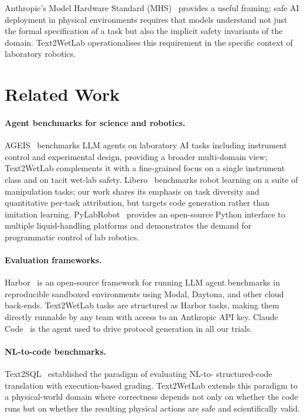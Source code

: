 \documentclass[11pt,a4paper]{article}
\begin{document}
Anthropic's Model Hardware Standard (MHS)~\citep{anthropic2026mhs}
provides a useful framing: safe AI deployment in physical environments
requires that models understand not just the formal specification of a task
but also the implicit safety invariants of the domain.
Text2WetLab operationalises this requirement in the specific context of
laboratory robotics.

\section{Related Work}
\label{sec:related}

\paragraph{Agent benchmarks for science and robotics.}
AGEIS~\citep{ageis2025} benchmarks LLM agents on laboratory AI tasks
including instrument control and experimental design, providing a broader
multi-domain view; Text2WetLab complements it with a fine-grained focus on
a single instrument class and on tacit wet-lab safety.
Libero~\citep{liu2023libero} benchmarks robot learning on a suite of
manipulation tasks; our work shares its emphasis on task diversity and
quantitative per-task attribution, but targets code generation rather than
imitation learning.
PyLabRobot~\citep{wierenga2023pylabrobot} provides an open-source Python
interface to multiple liquid-handling platforms and demonstrates the demand
for programmatic control of lab robotics.

\paragraph{Evaluation frameworks.}
Harbor~\citep{harbor2026} is an open-source framework for running LLM
agent benchmarks in reproducible sandboxed environments using Modal, Daytona,
and other cloud back-ends.
Text2WetLab tasks are structured as Harbor tasks, making them directly
runnable by any team with access to an Anthropic API key.
Claude Code~\citep{anthropic2026claudecode} is the agent used to drive
protocol generation in all our trials.

\paragraph{NL-to-code benchmarks.}
Text2SQL~\citep{yu2018spider} established the paradigm of evaluating NL-to-
structured-code translation with execution-based grading.
Text2WetLab extends this paradigm to a physical-world domain where
correctness depends not only on whether the code runs but on whether the
resulting physical actions are safe and scientifically valid.
\end{document}
